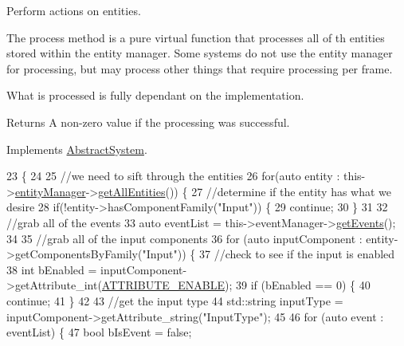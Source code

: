 Perform actions on entities. 

The process method is a pure virtual function that processes all of th entities stored within the entity manager. Some systems do not use the entity manager for processing, but may process other things that require processing per frame.

What is processed is fully dependant on the implementation.

\begin{DoxyReturn}{Returns}
A non-\/zero value if the processing was successful. 
\end{DoxyReturn}


Implements \hyperlink{class_abstract_system_af8bfe74feb5df2b5e3fff67bfe1106b9}{Abstract\-System}.


\begin{DoxyCode}
23                          \{
24 
25     \textcolor{comment}{//we need to sift through the entities}
26     \textcolor{keywordflow}{for}(\textcolor{keyword}{auto} entity : this->\hyperlink{class_abstract_system_ac0d16e94f5cea4b1a6bf489d35d7a14d}{entityManager}->\hyperlink{class_entity_manager_a452113e422a9c501bb008761f7609e33}{getAllEntities}()) \{
27         \textcolor{comment}{//determine if the entity has what we desire}
28         \textcolor{keywordflow}{if}(!entity->hasComponentFamily(\textcolor{stringliteral}{"Input"})) \{
29             \textcolor{keywordflow}{continue};
30         \}
31 
32         \textcolor{comment}{//grab all of the events}
33         \textcolor{keyword}{auto} eventList = this->eventManager->\hyperlink{class_event_manager_a7cd671ef1543ec52aac1db8c48655995}{getEvents}();
34 
35         \textcolor{comment}{//grab all of the input components}
36         \textcolor{keywordflow}{for} (\textcolor{keyword}{auto} inputComponent : entity->getComponentsByFamily(\textcolor{stringliteral}{"Input"})) \{
37             \textcolor{comment}{//check to see if the input is enabled}
38             \textcolor{keywordtype}{int} bEnabled = inputComponent->getAttribute\_int(\hyperlink{_a_e___attributes_8h_a4c775095baf8a9c99621ad9ad3b622db}{ATTRIBUTE\_ENABLE});
39             \textcolor{keywordflow}{if} (bEnabled == 0) \{
40                 \textcolor{keywordflow}{continue};
41             \}
42 
43             \textcolor{comment}{//get the input type}
44             std::string inputType = inputComponent->getAttribute\_string(\textcolor{stringliteral}{"InputType"});
45 
46             \textcolor{keywordflow}{for} (\textcolor{keyword}{auto} event : eventList) \{
47                 \textcolor{keywordtype}{bool} bIsEvent = \textcolor{keyword}{false};

\end{DoxyCode}
